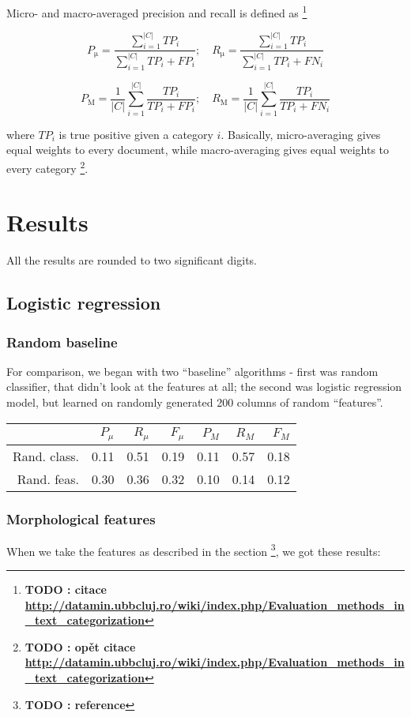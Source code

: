\documentclass[letterpaper]{article}
\newcommand{\todofn}[1] {
 \footnote{\textbf{TODO : #1}}}
\begin{document}
Micro- and macro-averaged precision and recall is defined as \todofn{citace \url{http://datamin.ubbcluj.ro/wiki/index.php/Evaluation_methods_in_text_categorization}} 

$$P_{\mathrm{\mu}} = \frac{\sum_{i=1}^{|C|}TP_{i}}{\sum_{i=1}^{|C|}TP_{i}+FP_{i}}; \quad R_{\mathrm{\mu}} = \frac{\sum_{i=1}^{|C|}TP_{i}}{\sum_{i=1}^{|C|}TP_{i}+FN_{i}}$$

$$P_{\mathrm{M}}=\frac{1}{|C|}\sum_{i=1}^{|C|}\frac{TP_{i}}{TP_{i}+FP_{i}};\quad R_{\mathrm{M}}=\frac{1}{|C|}\sum_{i=1}^{|C|}\frac{TP_{i}}{TP_{i}+FN_{i}}$$

where $TP_i$ is true positive given a category $i$. Basically, micro-averaging gives equal weights to every document, while macro-averaging gives equal weights to every category\todofn{opět citace \url{http://datamin.ubbcluj.ro/wiki/index.php/Evaluation_methods_in_text_categorization}}.

\section{Results}
All the results are rounded to two significant digits.
\subsection{Logistic regression}
\subsubsection{Random baseline}

For comparison, we began with two ``baseline'' algorithms - first was random classifier, that didn't look at the features at all; the second was logistic regression model, but learned on randomly generated 200 columns of random ``features''.

\begin{tabular}{|r|r|r|r|r|r|r|}
 \hline
 & $P_\mu$ & $R_\mu$ & $F_\mu$ & $P_M$ & $R_M$  & $F_M$ \\ \hline
Rand. class. & 0.11 & 0.51 & 0.19 & 0.11 & 0.57 & 0.18 \\ \hline
Rand. feas. & 0.30 & 0.36 & 0.32 & 0.10 & 0.14 & 0.12 \\ \hline
\end{tabular}

\subsubsection{Morphological features}
When we take the features as described in the section \todofn{reference}, we got these results:
\end{document}

